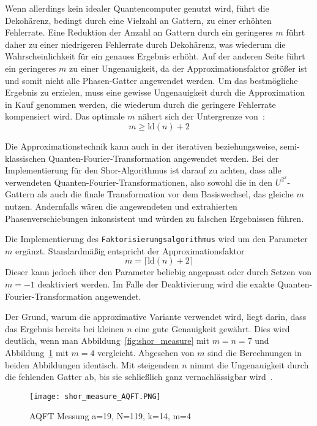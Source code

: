 Wenn allerdings kein idealer Quantencomputer genutzt wird, 
führt die Dekohärenz, 
bedingt durch eine Vielzahl an Gattern, 
zu einer erhöhten Fehlerrate.
Eine Reduktion der Anzahl an Gattern durch ein geringeres 
\(m\) führt daher zu einer niedrigeren Fehlerrate durch Dekohärenz, 
was wiederum die Wahrscheinlichkeit für ein genaues Ergebnis erhöht.
Auf der anderen Seite führt ein geringeres \(m\) zu einer Ungenauigkeit,
da der Approximationsfaktor größer ist und somit nicht alle Phasen-Gatter angewendet werden.
Um das bestmögliche Ergebnis zu erzielen, 
muss eine gewisse Ungenauigkeit durch die Approximation in Kauf genommen werden, 
die wiederum durch die geringere Fehlerrate kompensiert wird. 
Das optimale \(m\) nähert sich der Untergrenze von~\cite{Barenco_1996}:
\[m \geq \text{ld}(n)+2\]

Die Approximationstechnik kann auch in der iterativen beziehungsweise, 
semi-klassischen Quanten-Fourier-Transformation angewendet werden. 
Bei der Implementierung für den Shor-Algorithmus ist darauf zu achten, 
dass alle verwendeten Quanten-Fourier-Transformationen, also sowohl die in den \(U^{2^x}\)-Gattern als auch die finale Transformation vor dem Basiswechsel, 
das gleiche \(m\) nutzen.
Andernfalls wären die angewendeten und extrahierten Phasenverschiebungen inkonsistent 
und würden zu falschen Ergebnissen führen.

Die Implementierung des \texttt{Faktorisierungsalgorithmus} wird um den Parameter \(m\) ergänzt.
Standardmäßig entspricht der Approximationsfaktor 
\[m = \lceil\text{ld}(n)+2\rceil\]  
Dieser kann jedoch über den Parameter beliebig angepasst oder 
durch Setzen von \(m=-1\) deaktiviert werden.
Im Falle der Deaktivierung wird die exakte Quanten-Fourier-Transformation angewendet.

Der Grund, warum die approximative Variante verwendet wird, 
liegt darin, dass das Ergebnis bereits bei kleinen \(n\) eine gute Genauigkeit gewährt. 
Dies wird deutlich, wenn man Abbildung~\ref{fig:shor_measure} mit \(m=n=7\) und
Abbildung~\ref{fig:shor_measure_AQFT} mit \(m=4\) vergleicht.
Abgesehen von \(m\) sind die Berechnungen in beiden Abbildungen identisch.
Mit steigendem \(n\) nimmt die Ungenauigkeit durch die fehlenden Gatter ab, 
bis sie schließlich ganz vernachlässigbar wird~\cite{cheung2004improved}.

\begin{figure}[H]
  \centering
  \texttt{[image: shor\_measure\_AQFT.PNG]}
  \caption{AQFT Messung a=19, N=119, k=14, m=4}
  \label{fig:shor_measure_AQFT}
\end{figure}
